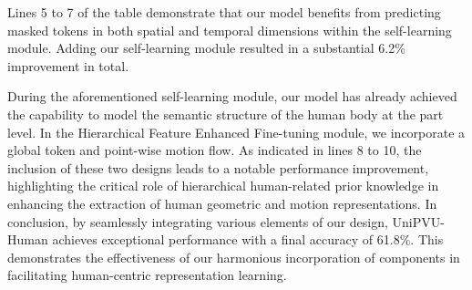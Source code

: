 Lines 5 to 7 of the table demonstrate that our model benefits from predicting masked tokens in both spatial and temporal dimensions within the self-learning module. Adding our self-learning module resulted in a substantial 6.2\% improvement in total. 

During the aforementioned self-learning module, our model has already achieved the capability to model the semantic structure of the human body at the part level. 
In the Hierarchical Feature Enhanced Fine-tuning module, we incorporate a global token and point-wise motion flow. As indicated in lines 8 to 10, the inclusion of these two designs leads to a notable performance improvement, highlighting the critical role of hierarchical human-related prior knowledge in enhancing the extraction of human geometric and motion representations. 
In conclusion, by seamlessly integrating various elements of our design, UniPVU-Human achieves exceptional performance with a final accuracy of 61.8\%. This demonstrates the effectiveness of our harmonious incorporation of components in facilitating human-centric representation learning.

